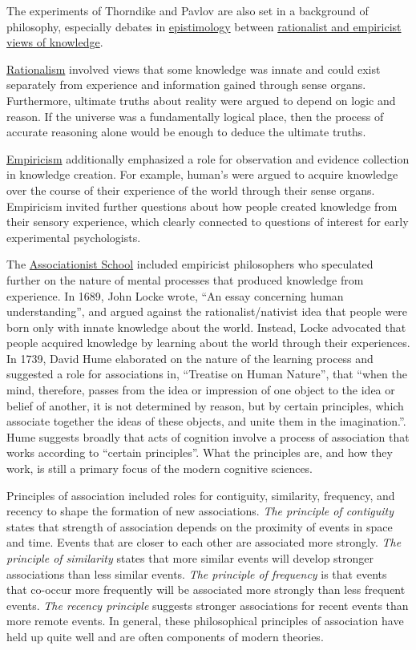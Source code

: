 \documentclass[
  oneside,
  12pt]{crumpbook}
\begin{document}
The experiments of Thorndike and Pavlov are also set in a background of philosophy, especially debates in \href{https://en.wikipedia.org/wiki/Epistemology}{epistimology} between \href{https://plato.stanford.edu/entries/rationalism-empiricism/}{rationalist and empiricist views of knowledge}.

\href{https://en.wikipedia.org/wiki/Rationalism}{Rationalism} involved views that some knowledge was innate and could exist separately from experience and information gained through sense organs. Furthermore, ultimate truths about reality were argued to depend on logic and reason. If the universe was a fundamentally logical place, then the process of accurate reasoning alone would be enough to deduce the ultimate truths.

\href{https://en.wikipedia.org/wiki/Empiricism}{Empiricism} additionally emphasized a role for observation and evidence collection in knowledge creation. For example, human's were argued to acquire knowledge over the course of their experience of the world through their sense organs. Empiricism invited further questions about how people created knowledge from their sensory experience, which clearly connected to questions of interest for early experimental psychologists.

The \href{https://en.wikipedia.org/wiki/Associationism\#Associationist_School}{Associationist School} included empiricist philosophers who speculated further on the nature of mental processes that produced knowledge from experience. In 1689, John Locke wrote, ``An essay concerning human understanding'', and argued against the rationalist/nativist idea that people were born only with innate knowledge about the world. Instead, Locke advocated that people acquired knowledge by learning about the world through their experiences. In 1739, David Hume elaborated on the nature of the learning process and suggested a role for associations in, ``Treatise on Human Nature'', that ``when the mind, therefore, passes from the idea or impression of one object to the idea or belief of another, it is not determined by reason, but by certain principles, which associate together the ideas of these objects, and unite them in the imagination.''. Hume suggests broadly that acts of cognition involve a process of association that works according to ``certain principles''. What the principles are, and how they work, is still a primary focus of the modern cognitive sciences.

Principles of association included roles for contiguity, similarity, frequency, and recency to shape the formation of new associations. \emph{The principle of contiguity} states that strength of association depends on the proximity of events in space and time. Events that are closer to each other are associated more strongly. \emph{The principle of similarity} states that more similar events will develop stronger associations than less similar events. \emph{The principle of frequency} is that events that co-occur more frequently will be associated more strongly than less frequent events. \emph{The recency principle} suggests stronger associations for recent events than more remote events. In general, these philosophical principles of association have held up quite well and are often components of modern theories.
\end{document}
